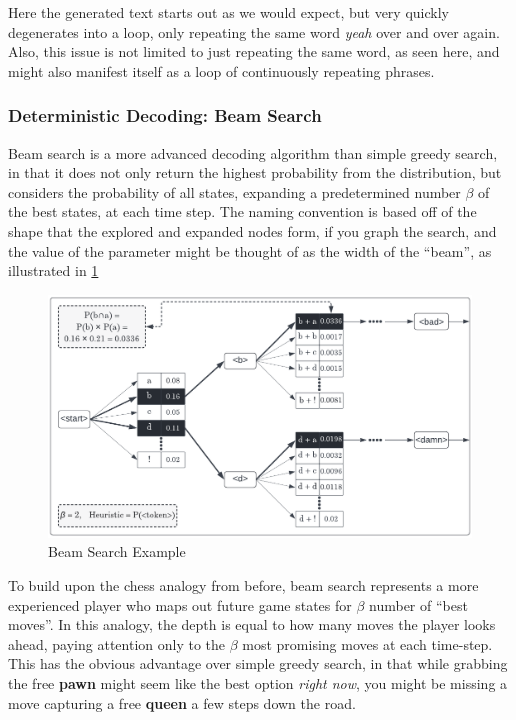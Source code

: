 Here the generated text starts out as we would expect, but very quickly degenerates into a loop, only repeating the same word \textit{yeah} over and over again. Also, this issue is not limited to just repeating the same word, as seen here, and might also manifest itself as a loop of continuously repeating phrases.

\subsubsection{Deterministic Decoding: Beam Search}
\label{sec:det-beam}

Beam search is a more advanced decoding algorithm than simple greedy search, in that it does not only return the highest probability from the distribution, but considers the probability of all states, expanding a predetermined number $\beta$ of the best states, at each time step. The naming convention is based off of the shape that the explored and expanded nodes form, if you graph the search, and the value of the parameter might be thought of as the width of the “beam”, as illustrated in \cref{fig:beamsearch}

\begin{figure}[ht!]
    \includegraphics[width=\textwidth, keepaspectratio=true]{figures/Beam Search (Character-based LM) (1).png}
    \caption{Beam Search Example}
    \label{fig:beamsearch}
\end{figure}

To build upon the chess analogy from before, beam search represents a more experienced player who maps out future game states for $\beta$ number of “best moves”. In this analogy, the depth is equal to how many moves the player looks ahead, paying attention only to the $\beta$ most promising moves at each time-step. This has the obvious advantage over simple greedy search, in that while grabbing the free \textbf{pawn} might seem like the best option \textit{right now}, you might be missing a move capturing a free \textbf{queen} a few steps down the road.


